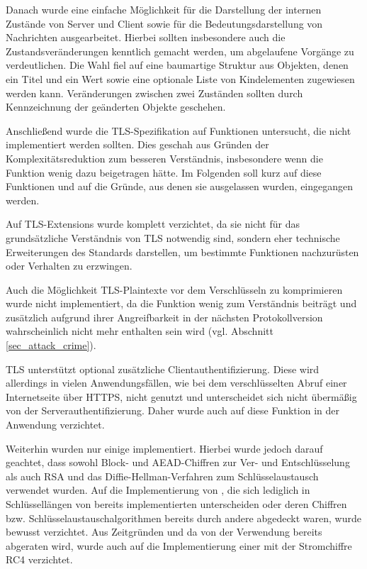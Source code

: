Danach wurde eine einfache Möglichkeit für die Darstellung der internen Zustände von Server und Client sowie für die Bedeutungsdarstellung von Nachrichten ausgearbeitet. Hierbei sollten insbesondere auch die Zustandsveränderungen kenntlich gemacht werden, um abgelaufene Vorgänge zu verdeutlichen. Die Wahl fiel auf eine baumartige Struktur aus Objekten, denen ein Titel und ein Wert sowie eine optionale Liste von Kindelementen zugewiesen werden kann. Veränderungen zwischen zwei Zuständen sollten durch Kennzeichnung der geänderten Objekte geschehen.


Anschließend wurde die TLS-Spezifikation auf Funktionen untersucht, die nicht implementiert werden sollten. Dies geschah aus Gründen der Komplexitätsreduktion zum besseren Verständnis, insbesondere wenn die Funktion wenig dazu beigetragen hätte. Im Folgenden soll kurz auf diese Funktionen und auf die Gründe, aus denen sie ausgelassen wurden, eingegangen werden.

Auf TLS-Extensions wurde komplett verzichtet, da sie nicht für das grundsätzliche Verständnis von TLS notwendig sind, sondern eher technische Erweiterungen des Standards darstellen, um bestimmte Funktionen nachzurüsten oder Verhalten zu erzwingen.

Auch die Möglichkeit TLS-Plaintexte vor dem Verschlüsseln zu komprimieren wurde nicht implementiert, da die Funktion wenig zum Verständnis beiträgt und zusätzlich aufgrund ihrer Angreifbarkeit in der nächsten Protokollversion wahrscheinlich nicht mehr enthalten sein wird (vgl. Abschnitt \ref{sec_attack_crime}).

TLS unterstützt optional zusätzliche Clientauthentifizierung. Diese wird allerdings in vielen Anwendungsfällen, wie bei dem verschlüsselten Abruf einer Internetseite über HTTPS, nicht genutzt und unterscheidet sich nicht übermäßig von der Serverauthentifizierung. Daher wurde auch auf diese Funktion in der Anwendung verzichtet.

Weiterhin wurden nur einige \ciphersuites{} implementiert. Hierbei wurde jedoch darauf geachtet, dass sowohl Block- und AEAD-Chiffren zur Ver- und Entschlüsselung als auch RSA und das Diffie-Hellman-Verfahren zum Schlüsselaustausch verwendet wurden. Auf die Implementierung von \ciphersuites{}, die sich lediglich in Schlüssellängen von bereits implementierten \ciphersuites{} unterscheiden oder deren Chiffren bzw. Schlüsselaustauschalgorithmen bereits durch andere \ciphersuites{} abgedeckt waren, wurde bewusst verzichtet. Aus Zeitgründen und da von der Verwendung bereits abgeraten wird, wurde auch auf die Implementierung einer \ciphersuite{} mit der Stromchiffre RC4 verzichtet.

